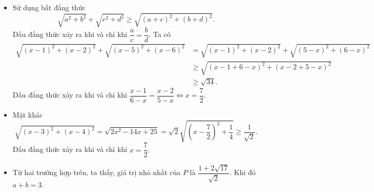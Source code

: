 \begin{ex}
{\begin{itemize}
\item Sử dụng bất đẳng thức
$$\sqrt{a^2 + b^2}+\sqrt{c^2 + d^2} \geqslant \sqrt{(a+c)^2 + (b+d)^2}.$$
Dấu đẳng thức xảy ra khi và chỉ khi $\dfrac{a}{c}=\dfrac{b}{d}$. Ta có
\begin{align*}
\sqrt{(x-1)^2 + (x-2)^2}  + \sqrt{(x-5)^2 + (x-6)^2} & = \sqrt{(x-1)^2 + (x-2)^2}  + \sqrt{(5-x)^2 + (6-x)^2} \\
& \geqslant \sqrt{(x-1 + 6-x)^2 + (x-2 + 5-x)^2}\\
& \geqslant \sqrt{34}.
\end{align*}
Dấu đẳng thức xảy ra khi và chỉ khi
$\dfrac{x-1}{6-x}=\dfrac{x-2}{5-x} \Leftrightarrow x=\dfrac{7}{2}.$
\item Mặt khác
$$\sqrt{(x-3)^2 + (x-4)^2} =\sqrt{2x^2 - 14 x + 25} = \sqrt{2}\sqrt{\left (x-\dfrac{7}{2}\right)^2 + \dfrac{1}{4} } \geqslant \dfrac{1}{\sqrt{2}}.$$
Dấu đẳng thức xảy ra khi và chỉ khi $x=\dfrac{7}{2}.$
\item Từ hai trường hợp trên, ta thấy, giá trị nhỏ nhất của $P$ là $\dfrac{1+2 \sqrt{17}}{\sqrt{2}}$. Khi đó $a + b = 3.$
\end{itemize}
 }
\end{ex}

